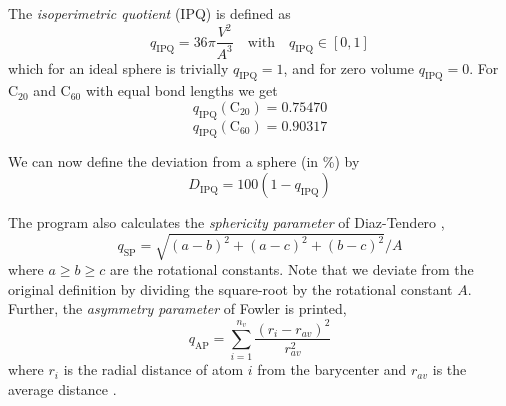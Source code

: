 \documentclass[article,a4paper,twoside]{memoir}
\newcommand{\C}[1]{\ensuremath{\mathrm{C}_{#1}}}
\begin{document}
The \textit{isoperimetric quotient} (IPQ) is defined as
\begin{equation}
 q_{\textrm{IPQ}} =36\pi \frac{V^{2} }{A^{3}}\quad\text{with}\quad q_{\textrm{IPQ}}\in [0,1]
 \label{IPQ}
 \end{equation}
which for an ideal sphere is trivially $q_{\textrm{IPQ}}=1$, and for zero volume $q_{\textrm{IPQ}}=0$. For \C{20} 
and \C{60} with equal bond lengths we get
\begin{equation}
\label{IPQC20}
q_{\textrm{IPQ}} (\C{20}) =0.75470 
\end{equation} 
\begin{equation}
\label{IPQC60}
q_{\textrm{IPQ}} (\C{60}) =0.90317 
\end{equation} 

 We can now define the deviation from a sphere (in \%) by
\begin{equation} 
D_{\textrm{IPQ}} =100\left(1-q_{\textrm{IPQ}} \right) 
\end{equation}

The program also calculates the \textit{sphericity parameter} of Diaz-Tendero \cite{Diaz},
\begin{equation}
\label{Diaz}
q_{\textrm{SP}} = \sqrt{(a-b)^2+(a-c)^2+(b-c)^2}/A 
\end{equation}
where $a \ge b \ge c$ are the rotational constants. Note that we deviate from the original definition by dividing 
the square-root by the rotational constant $A$. Further, the \textit{asymmetry parameter} of Fowler is printed,
\begin{equation}
\label{Diaz}
q_{\textrm{AP}} = \sum_{i=1}^{n_v}  \frac{(r_i-r_{av})^2}{r_{av}^2}
\end{equation}
where $r_i$ is the radial distance of atom $i$ from the barycenter and $r_{av}$ is the average distance \cite{Fowler2000}.
\end{document}
